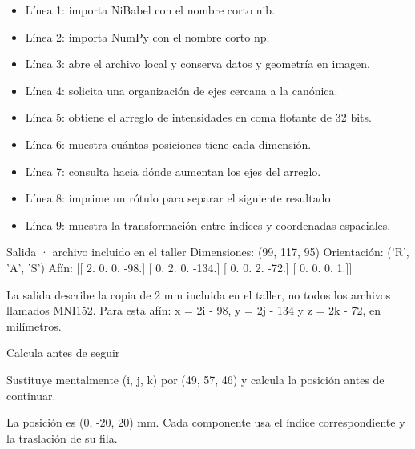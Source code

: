 
\begin{itemize}

\item Línea 1: importa NiBabel con el nombre corto nib.

\item Línea 2: importa NumPy con el nombre corto np.

\item Línea 3: abre el archivo local y conserva datos y geometría en imagen.

\item Línea 4: solicita una organización de ejes cercana a la canónica.

\item Línea 5: obtiene el arreglo de intensidades en coma flotante de 32 bits.

\item Línea 6: muestra cuántas posiciones tiene cada dimensión.

\item Línea 7: consulta hacia dónde aumentan los ejes del arreglo.

\item Línea 8: imprime un rótulo para separar el siguiente resultado.

\item Línea 9: muestra la transformación entre índices y coordenadas espaciales.

\end{itemize}

\begin{Salida}{Salida · archivo incluido en el taller}
Dimensiones: (99, 117, 95)
Orientación: ('R', 'A', 'S')
Afín:
[[   2.    0.    0.  -98.]
 [   0.    2.    0. -134.]
 [   0.    0.    2.  -72.]
 [   0.    0.    0.    1.]]
\end{Salida}

La salida describe la copia de 2 mm incluida en el taller, no todos los archivos llamados MNI152. Para esta afín: x = 2i - 98, y = 2j - 134 y z = 2k - 72, en milímetros.



\begin{Practica}{Calcula antes de seguir}

Sustituye mentalmente (i, j, k) por (49, 57, 46) y calcula la posición antes de continuar.


La posición es (0, -20, 20) mm. Cada componente usa el índice correspondiente y la traslación de su fila.


\end{Practica}

